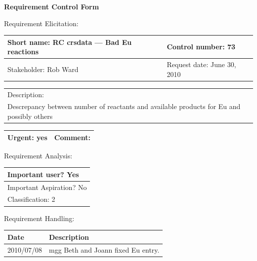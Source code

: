 \begin{center}\Large\bf
Requirement Control Form
\end{center}
\vspace{24pt}

Requirement Elicitation:

\begin{tabular}{|p{211pt}|p{211pt}|} \hline
Short name: RC crsdata --- Bad Eu reactions & Control number: 73\\ \hline
Stakeholder: Rob Ward & Request date: June 30, 2010\\
\end{tabular}
\begin{tabular}{|p{433pt}|} \hline
Description: \\ 
Descrepancy between number of reactants and available products for Eu
and possibly others
\\ \hline
\end{tabular} 
\begin{tabular}{|p{211pt}|p{211pt}|} \hline
Urgent: yes & Comment:
\\ \hline
\end{tabular}

\vspace{24pt}

Requirement Analysis:

\begin{tabular}{|p{433pt}|} \hline
Important user? Yes \\ \hline
Important Aspiration? No \\ \hline
Classification: 2 \\ \hline
\end{tabular}
\vspace{24pt}

Requirement Handling:

\begin{tabular}{|p{72pt}|p{351pt}|} \hline
Date & Description \\ \hline
2010/07/08 & mgg Beth and Joann fixed Eu entry. \\ \hline
\end{tabular}
